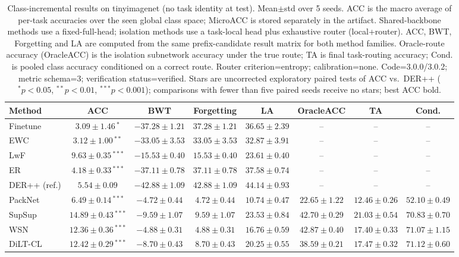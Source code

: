 \begin{table}[t]
\centering
\caption{Class-incremental results on tinyimagenet (no task identity at test). Mean$\pm$std over 5 seeds. ACC is the macro average of per-task accuracies over the seen global class space; MicroACC is stored separately in the artifact. Shared-backbone methods use a fixed-full-head; isolation methods use a task-local head plus exhaustive router (local+router). ACC, BWT, Forgetting and LA are computed from the same prefix-candidate result matrix for both method families. Oracle-route accuracy (OracleACC) is the isolation subnetwork accuracy under the true route; TA is final task-routing accuracy; Cond. is pooled class accuracy conditioned on a correct route. Router criterion=entropy; calibration=none. Code=3.0.0/3.0.2; metric schema=3; verification status=verified. Stars are uncorrected exploratory paired tests of ACC vs.\ DER++ ($^{*}p<0.05$, $^{**}p<0.01$, $^{***}p<0.001$); comparisons with fewer than five paired seeds receive no stars; best ACC bold.}
\label{tab:classil_tinyimagenet}
\begin{tabular}{lccccccc}
\toprule
Method & ACC & BWT & Forgetting & LA & OracleACC & TA & Cond. \\
\midrule
Finetune & $3.09\pm1.46$\,$^{*}$ & $-37.28\pm1.21$ & $37.28\pm1.21$ & $36.65\pm2.39$ & -- & -- & -- \\
EWC & $3.12\pm1.00$\,$^{**}$ & $-33.05\pm3.53$ & $33.05\pm3.53$ & $32.87\pm3.91$ & -- & -- & -- \\
LwF & $9.63\pm0.35$\,$^{***}$ & $-15.53\pm0.40$ & $15.53\pm0.40$ & $23.61\pm0.40$ & -- & -- & -- \\
ER & $4.18\pm0.33$\,$^{***}$ & $-37.11\pm0.78$ & $37.11\pm0.78$ & $37.58\pm0.74$ & -- & -- & -- \\
DER++ (ref.) & $5.54\pm0.09$ & $-42.88\pm1.09$ & $42.88\pm1.09$ & $44.14\pm0.93$ & -- & -- & -- \\
PackNet & $6.49\pm0.14$\,$^{***}$ & $-4.72\pm0.44$ & $4.72\pm0.44$ & $10.74\pm0.47$ & $22.65\pm1.22$ & $12.46\pm0.26$ & $52.10\pm0.49$ \\
SupSup & $\mathbf{14.89\pm0.43}$\,$^{***}$ & $-9.59\pm1.07$ & $9.59\pm1.07$ & $23.53\pm0.84$ & $42.70\pm0.29$ & $21.03\pm0.54$ & $70.83\pm0.70$ \\
WSN & $12.36\pm0.36$\,$^{***}$ & $-4.88\pm0.31$ & $4.88\pm0.31$ & $16.76\pm0.59$ & $42.87\pm0.40$ & $17.40\pm0.33$ & $71.07\pm1.15$ \\
DiLT-CL & $12.42\pm0.29$\,$^{***}$ & $-8.70\pm0.43$ & $8.70\pm0.43$ & $20.25\pm0.55$ & $38.59\pm0.21$ & $17.47\pm0.32$ & $71.12\pm0.60$ \\
\bottomrule
\end{tabular}
\end{table}
